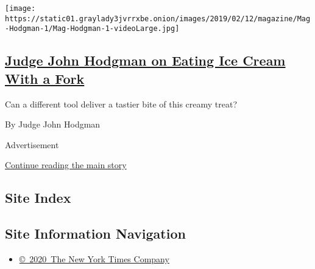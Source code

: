 \begin{enumerate}
  \texttt{[image: https://static01.graylady3jvrrxbe.onion/images/2019/02/12/magazine/Mag-Hodgman-1/Mag-Hodgman-1-videoLarge.jpg]}

  \hypertarget{judge-john-hodgman-on-eating-ice-cream-with-a-fork}{%
  \subsection{\texorpdfstring{\href{/2020/03/26/magazine/judge-john-hodgman-on-eating-ice-cream-with-a-fork.html}{Judge
  John Hodgman on Eating Ice Cream With a
  Fork}}{Judge John Hodgman on Eating Ice Cream With a Fork}}\label{judge-john-hodgman-on-eating-ice-cream-with-a-fork}}

  Can a different tool deliver a tastier bite of this creamy treat?

  By Judge John Hodgman
\end{enumerate}

Advertisement

\protect\hyperlink{after-mid1}{Continue reading the main story}

\hypertarget{site-index}{%
\subsection{Site Index}\label{site-index}}

\hypertarget{site-information-navigation}{%
\subsection{Site Information
Navigation}\label{site-information-navigation}}

\begin{itemize}
\tightlist
\item
  \href{https://help.nytimes3xbfgragh.onion/hc/en-us/articles/115014792127-Copyright-notice}{©~2020~The
  New York Times Company}
\end{itemize}

